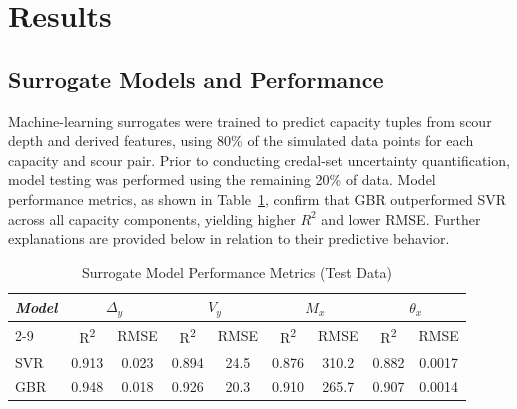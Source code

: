 \documentclass[authoryear,preprint,review,12pt]{elsarticle}
\begin{document}
\section{Results}
\subsection{Surrogate Models and Performance}

Machine-learning surrogates were trained to predict capacity tuples from scour depth and derived features, using 80\% of the simulated data points for each capacity and scour pair. Prior to conducting credal-set uncertainty quantification, model testing was performed using the remaining 20\% of data. Model performance metrics, as shown in Table~\ref{tab:model_performance}, confirm that GBR outperformed SVR across all capacity components, yielding higher $R^2$ and lower RMSE. Further explanations are provided below in relation to their predictive behavior.


\begin{table}[htbp]
\caption{Surrogate Model Performance Metrics (Test Data)}
\label{tab:model_performance}
\centering
\begin{tabular}{|l|c|c|c|c|c|c|c|c|}
\hline
\multirow{2}{*}{\textit{Model}} & \multicolumn{2}{c|}{\textit{$\Delta_y$}} & \multicolumn{2}{c|}{\textit{$V_y$}} & \multicolumn{2}{c|}{\textit{$M_x$}} & \multicolumn{2}{c|}{\textit{$\theta_x$}} \\
\cline{2-9}
& R\textsuperscript{2} & RMSE & R\textsuperscript{2} & RMSE & R\textsuperscript{2} & RMSE & R\textsuperscript{2} & RMSE \\
\hline
SVR & 0.913 & 0.023 & 0.894 & 24.5 & 0.876 & 310.2 & 0.882 & 0.0017 \\
GBR & 0.948 & 0.018 & 0.926 & 20.3 & 0.910 & 265.7 & 0.907 & 0.0014 \\
\hline
\end{tabular}
\end{table}
\end{document}
